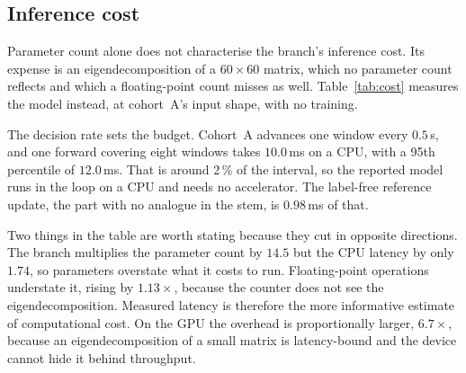 \documentclass[a4paper,fleqn]{cas-dc}
\begin{document}
\subsection{Inference cost}\label{sec:cost}

Parameter count alone does not characterise the branch's inference cost. Its expense is an eigendecomposition of a $60\times60$ matrix, which no parameter count reflects and which a floating-point count misses as well. Table~\ref{tab:cost} measures the model instead, at cohort~A's input shape, with no training.

\begin{table}[t]
\centering
\caption{Inference cost at cohort~A's input shape. The benchmark passes eight windows per forward and returns one decision, more than the reported model needs, since it classifies each window on its own, so the figures are an upper bound on per-window cost. GPU figures are from an NVIDIA GeForce RTX 5080; CPU figures are from the processor of the same workstation, whose model was not recorded. Latency is the median over 200 forwards after warm-up, batch~1, with CUDA synchronised; the 95th percentile is given for the online case. No training.}
\label{tab:cost}
\end{table}

The decision rate sets the budget. Cohort~A advances one window every $0.5$\,s, and one forward covering eight windows takes $10.0$\,ms on a CPU, with a 95th percentile of $12.0$\,ms. That is around 2\,\% of the interval, so the reported model runs in the loop on a CPU and needs no accelerator. The label-free reference update, the part with no analogue in the stem, is $0.98$\,ms of that.

Two things in the table are worth stating because they cut in opposite directions. The branch multiplies the parameter count by $14.5$ but the CPU latency by only $1.74$, so parameters overstate what it costs to run. Floating-point operations understate it, rising by $1.13\times$, because the counter does not see the eigendecomposition. Measured latency is therefore the more informative estimate of computational cost. On the GPU the overhead is proportionally larger, $6.7\times$, because an eigendecomposition of a small matrix is latency-bound and the device cannot hide it behind throughput.
\end{document}

